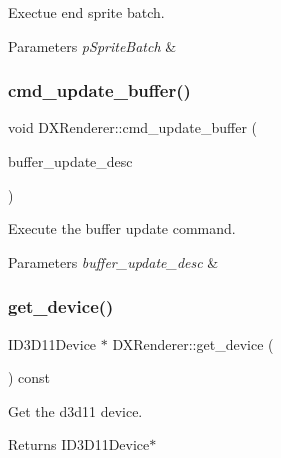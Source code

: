 Exectue end sprite batch. 


\begin{DoxyParams}{Parameters}
{\em p\+Sprite\+Batch} & \\
\hline
\end{DoxyParams}
\mbox{\label{classDXRenderer_ab3e0561b3419a6583505514eb979edba}} 
\subsubsection{\texorpdfstring{cmd\+\_\+update\+\_\+buffer()}{cmd\_update\_buffer()}}
{\footnotesize\ttfamily void D\+X\+Renderer\+::cmd\+\_\+update\+\_\+buffer (\begin{DoxyParamCaption}\item[{const \hyperlink{structBufferUpdateDesc}{Buffer\+Update\+Desc} \&}]{buffer\+\_\+update\+\_\+desc }\end{DoxyParamCaption})}



Execute the buffer update command. 


\begin{DoxyParams}{Parameters}
{\em buffer\+\_\+update\+\_\+desc} & \\
\hline
\end{DoxyParams}
\mbox{\label{classDXRenderer_a93e38bbc88225a3244e336974674774b}} 
\subsubsection{\texorpdfstring{get\+\_\+device()}{get\_device()}}
{\footnotesize\ttfamily I\+D3\+D11\+Device $\ast$ D\+X\+Renderer\+::get\+\_\+device (\begin{DoxyParamCaption}{ }\end{DoxyParamCaption}) const}



Get the d3d11 device. 

\begin{DoxyReturn}{Returns}
I\+D3\+D11\+Device$\ast$ 
\end{DoxyReturn}
\mbox{\label{classDXRenderer_ada893f000ff5b8bd2b0f24539f6be420}} 
